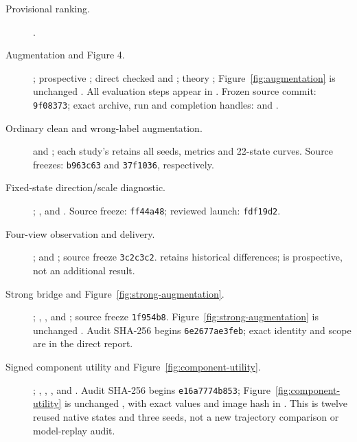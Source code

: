 \documentclass[10pt]{article}
\begin{document}
{\begin{description}
\item[Provisional ranking.] .
\item[Augmentation and Figure 4.] ; prospective ; direct checked  and ; theory ; Figure~\ref{fig:augmentation} is unchanged . All evaluation steps appear in . Frozen source commit: \texttt{9f08373}; exact archive, run and completion handles:  and .
\item[Ordinary clean and wrong-label augmentation.]  and ; each study's  retains all seeds, metrics and 22-state curves. Source freezes: \texttt{b963c63} and \texttt{37f1036}, respectively.
\item[Fixed-state direction/scale diagnostic.] ; ,  and . Source freeze: \texttt{ff44a48}; reviewed launch: \texttt{fdf19d2}.
\item[Four-view observation and delivery.] ;  and ; source freeze \texttt{3c2c3c2}.  retains historical differences;  is prospective, not an additional result.
\item[Strong bridge and Figure~\ref{fig:strong-augmentation}.] ; , ,  and ; source freeze \texttt{1f954b8}. Figure~\ref{fig:strong-augmentation} is unchanged . Audit SHA-256 begins \texttt{6e2677ae3feb}; exact identity and scope are in the direct report.
\item[Signed component utility and Figure~\ref{fig:component-utility}.] ; , , ,  and . Audit SHA-256 begins \texttt{e16a7774b853}; Figure~\ref{fig:component-utility} is unchanged , with exact values and image hash in . This is twelve reused native states and three seeds, not a new trajectory comparison or model-replay audit.

\end{description}}
\end{document}
